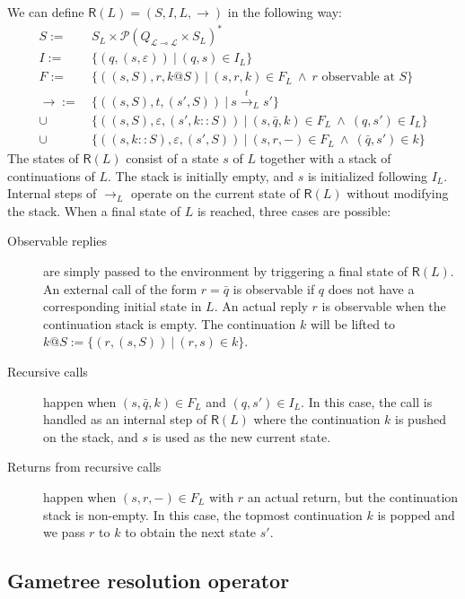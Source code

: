 \documentclass[11pt]{article}
\newcommand{\kw}[1]{{\mathsf{#1}}}
\begin{document}
We can define $\kw{R}(L) = (S, I, L, {\rightarrow})$ in the following way:
\begin{align*}
  S := &\: S_L \times \mathcal{P}(Q_{\mathcal{L} \multimap \mathcal{L}} \times S_L)^* \\
  I := &\: \{ (q, (s, \varepsilon)) \: \vert \: (q, s) \in I_L \} \\
  F := &\: \{ ((s, S), r, k@S) \: \vert \:
           (s, r, k) \in F_L \: \wedge \: r \mbox{ observable at } S \} \\
  {\rightarrow} := &\: \{ ((s, S), t, (s', S)) \: \vert \: s \stackrel{t}{\longrightarrow}_L s' \} \\
    \cup &\: \{ ((s, S), \varepsilon, (s', k::S)) \: \vert \:
        (s, \bar{q}, k) \in F_L \: \wedge \:
        (q, s') \in I_L \} \\
    \cup &\: \{ ((s, k::S), \varepsilon, (s', S)) \: \vert \:
        (s, r, -) \in F_L \: \wedge \:
        (\bar{q}, s') \in k \}
\end{align*}
The states of $\kw{R}(L)$
consist of a state $s$ of $L$ together with a stack of continuations of $L$.
The stack is initially empty,
and $s$ is initialized following $I_L$.
Internal steps of $\rightarrow_L$ operate on the current state of $\kw{R}(L)$
without modifying the stack.
When a final state of $L$ is reached, three cases are possible:
\begin{description}
\item[Observable replies] are simply passed to the environment
  by triggering a final state of $\kw{R}(L)$.
  An external call of the form $r = \bar{q}$ is observable
  if $q$ does not have a corresponding initial state in $L$.
  An actual reply $r$ is observable when the continuation stack is empty.
  The continuation $k$ will be lifted to
  $k@S := \{ (r, (s, S)) \: \vert \: (r, s) \in k \}$.
\item[Recursive calls] happen when
  $(s, \bar{q}, k) \in F_L$ and $(q, s') \in I_L$.
  In this case, the call is handled as an internal step of $\kw{R}(L)$
  where the continuation $k$ is pushed on the stack,
  and $s$ is used as the new current state.
\item[Returns from recursive calls] happen when $(s, r, -) \in F_L$
  with $r$ an actual return, but the continuation stack is non-empty.
  In this case, the topmost continuation $k$ is popped
  and we pass $r$ to $k$ to obtain the next state $s'$.
\end{description}

\subsection{Gametree resolution operator}
\end{document}
